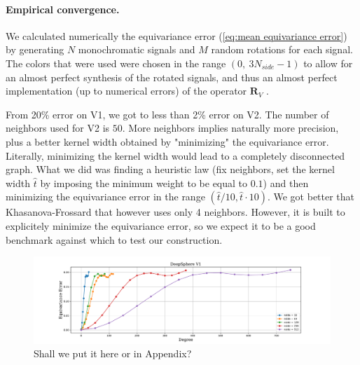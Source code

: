 \documentclass{article} %
\renewcommand{\b}[1]{{\bm{#1}}}   %
\newcommand{\mart}[1]{{\color[rgb]{.9,.5,.3}{#1}}}
\begin{document}
\paragraph{Empirical convergence.}

We calculated numerically the equivariance error (\ref{eq:mean equivariance error}) by generating $N$ monochromatic signals and $M$ random rotations for each signal. The colors that were used were chosen in the range $(0,\  3N_{side}-1)$ to allow for an almost perfect synthesis of the rotated signals, and thus an almost perfect implementation (up to numerical errors) of the operator $\b{R}_V$ \citep{healpix_primer}.

From 20\% error on V1, we got to less than 2\% error on V2. The number of neighbors used for V2 is $50$. More neighbors implies naturally more precision, plus a better kernel width obtained by "minimizing" the equivariance error. \mart{How to explain how we found the kernel width? Micha\"el I need your help here!!} Literally, minimizing the kernel width would lead to a completely disconnected graph. What we did was finding a heuristic law (fix neighbors, set the kernel width $\hat t$ by imposing the minimum weight to be equal to $0.1$) and then minimizing the equivariance error in the range $(\hat t / 10, \hat t\cdot 10) $. We got better that Khasanova-Frossard \mart{(check the code)} that however uses only 4 neighbors. However, it is built to explicitely minimize the equivariance error, so we expect it to be a good benchmark against which to test our construction.
\begin{figure}
	\centering
	\includegraphics[width=0.9\linewidth]{DeepSphereV1}
	\caption{Shall we put it here or in Appendix?
	}
	\label{fig:deepsphereV1}
\end{figure}
\end{document}
